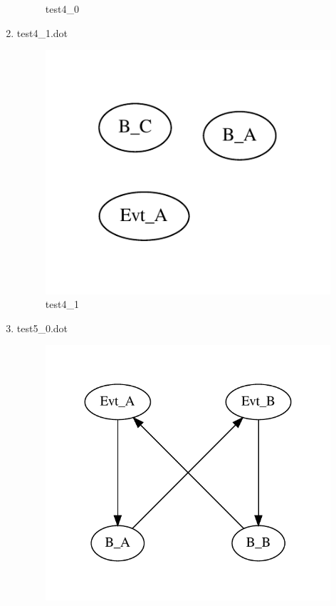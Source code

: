 \documentclass[12pt,a4paper]{report}
\begin{document}
\begin{enumerate}
\begin{figure}
        \caption{test4\_0}
        \label{fig:test4_0}
    \end{figure}
\item test4\_1.dot
    \begin{figure}
        \centering 
        \includegraphics*[width=1.0\textwidth,keepaspectratio]{TestPattern/test4_1.pdf}
        \caption{test4\_1}
        \label{fig:test4_1}
    \end{figure}
\item test5\_0.dot
    \begin{figure}
        \centering 
        \includegraphics*[width=1.0\textwidth,keepaspectratio]{TestPattern/test5_0.pdf}

\end{figure}
\end{enumerate}
\end{document}
